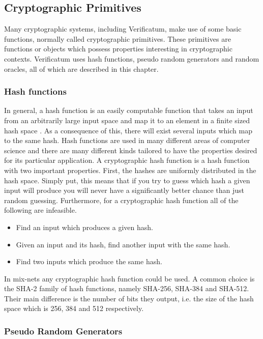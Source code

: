 \subsection{Cryptographic Primitives}

Many cryptographic systems, including Verificatum, make use of some
basic functions, normally called cryptographic primitives. These
primitives are functions or objects which possess properties
interesting in cryptographic contexts. Verificatum uses hash
functions, pseudo random generators and random oracles, all of which
are described in this chapter.

\subsubsection{Hash functions}
In general, a hash function is an easily computable function that
takes an input from an arbitrarily large input space and map it to an
element in a finite sized hash space \cite[p.~321]{hac}. As a consequence of this, there
will exist several inputs which map to the same hash. Hash functions
are used in many different areas of computer science and there are
many different kinds tailored to have the properties desired for its
particular application. A cryptographic hash function is a hash
function with two important properties. First, the hashes are
uniformly distributed in the hash space. Simply put, this means that
if you try to guess which hash a given input will produce you will
never have a significantly better chance than just random
guessing. Furthermore, for a cryptographic hash function all of the
following are infeasible.

\begin{itemize}
\item Find an input which produces a given hash.
\item Given an input and its hash, find another input with the same hash.
\item Find two inputs which produce the same hash.
\end{itemize}

In mix-nets any cryptographic hash function could be used. A
common choice is the SHA-2 family of hash functions, namely SHA-256,
SHA-384 and SHA-512. Their main difference is the number of bits they
output, i.e. the size of the hash space which is 256, 384 and 512
respectively.

\subsubsection{Pseudo Random Generators}

